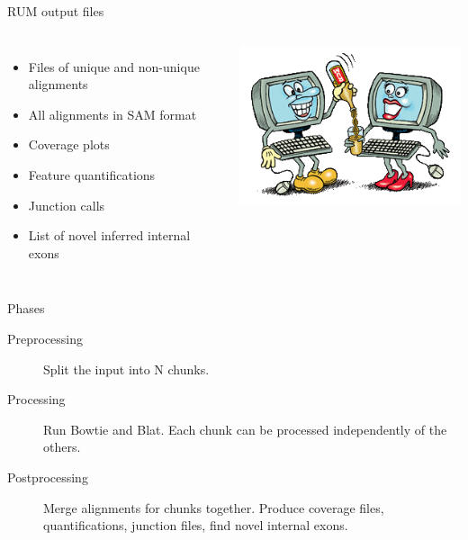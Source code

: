 \documentclass{beamer}
\begin{document}
\begin{frame}{RUM output files}
  \begin{columns}
    \column{2.5in}
\begin{itemize}
  \item Files of unique and non-unique alignments
  \item All alignments in SAM format
  \item Coverage plots
  \item Feature quantifications
  \item Junction calls
  \item List of novel inferred internal exons
\end{itemize}
\column{2.5in}
\includegraphics[scale=0.4]{rumpouring2.png}
  \end{columns}

\end{frame}

\begin{frame}{Phases}
  \begin{description}
    \item [Preprocessing] 
      Split the input into N chunks.
    \item [Processing] Run Bowtie and Blat. Each chunk can be
      processed independently of the others.
    \item [Postprocessing] Merge alignments for chunks
      together. Produce coverage files, quantifications, junction
      files, find novel internal exons.
  \end{description}
\end{frame}
\end{document}

